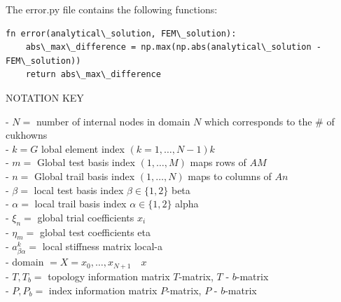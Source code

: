\documentclass[12pt, oneside]{book}
\begin{document}
The error.py file contains the following functions:

\begin{lstlisting}
fn error(analytical\_solution, FEM\_solution):
    abs\_max\_difference = np.max(np.abs(analytical\_solution - FEM\_solution))
    return abs\_max\_difference
\end{lstlisting}

       





NOTATION KEY

- $N=$ number of internal nodes in domain $N$ which corresponds to the \# of cukhowns \\
- $k=G$ lobal element index $(k=1, \ldots, N-1) k$ \\
- $m=$ Global test basis index $(1, \ldots, M)$ maps rows of $A M$ \\
- $n=$ Global trail basis index $(1, \ldots, N)$ maps to columns of $A n$ \\
- $\beta=$ local test basis index $\beta \in\{1,2\}$ beta \\
- $\alpha=$ local trail basis index $\alpha \in\{1,2\}$ alpha \\
- $\xi_{n}=$ global trial coefficients $x_{i}$ \\
- $\eta_{m}=$ global test coefficients eta \\
- $a_{\beta \alpha}^{k}=$ local stiffness matrix local-a \\
- domain $=X=x_{0}, \ldots, x_{N+1} \quad x$ \\
- $T, T_{b}=$ topology information matrix $T$-matrix, $T$ - $b$-matrix \\
- $P, P_{b}=$ index information matrix $P$-matrix, $P$ - $b$-matrix \\
\end{document}
